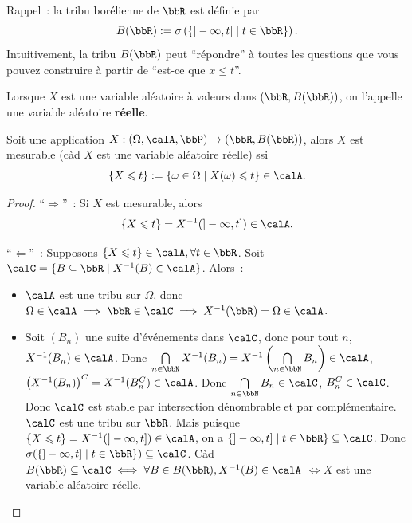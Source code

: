 \begin{rqq}
    Rappel~: la tribu borélienne de $\bbR$ est définie par
    \[ B(\bbR) := \sigma \left(\{ ]-\infty, t] \mid t \in \bbR \}\right). \]
    Intuitivement, la tribu $B(\bbR)$ peut ``répondre'' à toutes les questions que vous pouvez construire à partir de
    ``est-ce que $x \leqslant t$''.
\end{rqq}

\begin{deff}
    Lorsque $X$ est une variable aléatoire à valeurs dans $(\bbR, B(\bbR))$,
    on l'appelle une variable aléatoire \textbf{réelle}.
\end{deff}

\begin{prop}
    Soit une application $X: (\Omega, \calA, \bbP) \to (\bbR, B(\bbR))$,
    alors $X$ est mesurable (càd $X$ est une variable aléatoire réelle) ssi
    \[ \{ X \leqslant t \} := \{ \omega \in \Omega \mid X(\omega) \leqslant t \} \in \calA. \]
\end{prop}

\begin{proof}
    ``$\Rightarrow$''~: Si $X$ est mesurable, alors
    \[ \{ X \leqslant t \} = X^{-1}(]-\infty, t]) \in \calA. \]

    ``$\Leftarrow$''~: Supposons $\{ X \leqslant t \} \in \calA, \forall t \in \bbR$.
    Soit $\calC = \{ B \subseteq \bbR \mid X^{-1}(B) \in \calA \}$.
    Alors~:
    \begin{itemize}
        \item $\calA$ est une tribu sur $\Omega$, donc $\Omega \in \calA
                  \implies \bbR \in \calC \implies X^{-1}(\bbR) = \Omega \in \calA$.
        \item Soit $(B_n)$ une suite d'événements dans $\calC$,
              donc pour tout $n$, $X^{-1}(B_n) \in \calA$.
              Donc $\bigcap\limits_{n \in \bbN} X^{-1}(B_n) = X^{-1} \left(\bigcap\limits_{n \in \bbN} B_n\right) \in \calA$,
              $\left(X^{-1}(B_n)\right)^C = X^{-1}(B_n^C) \in \calA$.
              Donc $\bigcap\limits_{n \in \bbN} B_n \in \calC$, $B_n^C \in \calC$.
              Donc $\calC$ est stable par intersection dénombrable et par complémentaire.
              $\calC$ est une tribu sur $\bbR$.
              Mais puisque $\{ X \leqslant t \} = X^{-1}(]-\infty, t]) \in \calA$,
              on a $\{ ]-\infty, t] \mid t \in \bbR \} \subseteq \calC$.
              Donc $\sigma(\{ ]-\infty, t] \mid t \in \bbR \}) \subseteq \calC$.
              Càd $B(\bbR) \subseteq \calC \iff \forall B \in B(\bbR), X^{-1}(B) \in \calA$
              $\iff X$ est une variable aléatoire réelle.
    \end{itemize}
\end{proof}

